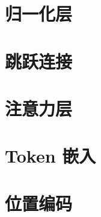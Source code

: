 \section{归一化层}\label{sec4.6}

\section{跳跃连接}\label{sec4.7}

\section{注意力层}\label{sec4.8}

\section{Token 嵌入}\label{sec4.9}

\section{位置编码}\label{sec4.10}